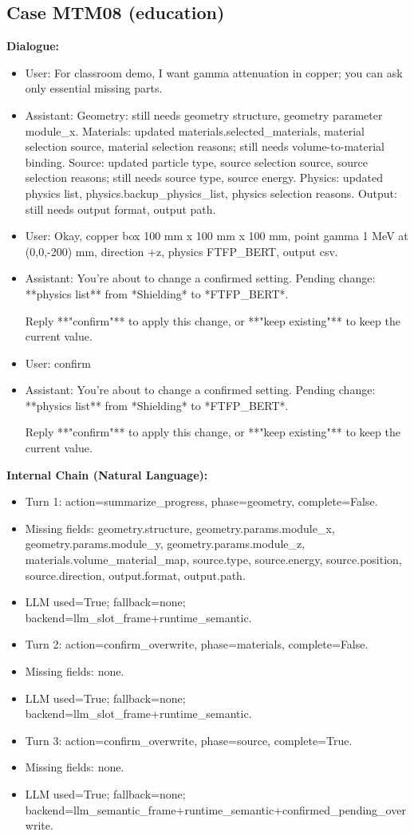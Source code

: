 \documentclass[11pt]{ctexart}
\begin{document}
\subsection{Case MTM08 (education)}
\textbf{Dialogue:}
\begin{itemize}
\item User: For classroom demo, I want gamma attenuation in copper; you can ask only essential missing parts.
\item Assistant: Geometry: still needs geometry structure, geometry parameter module\_x. Materials: updated materials.selected\_materials, material selection source, material selection reasons; still needs volume-to-material binding. Source: updated particle type, source selection source, source selection reasons; still needs source type, source energy. Physics: updated physics list, physics.backup\_physics\_list, physics selection reasons. Output: still needs output format, output path.
\item User: Okay, copper box 100 mm x 100 mm x 100 mm, point gamma 1 MeV at (0,0,-200) mm, direction +z, physics FTFP\_BERT, output csv.
\item Assistant: You're about to change a confirmed setting.  
Pending change: **physics list** from *Shielding* to *FTFP\_BERT*.  

Reply **"confirm"** to apply this change, or **"keep existing"** to keep the current value.
\item User: confirm
\item Assistant: You're about to change a confirmed setting.  
Pending change: **physics list** from *Shielding* to *FTFP\_BERT*.  

Reply **"confirm"** to apply this change, or **"keep existing"** to keep the current value.
\end{itemize}
\textbf{Internal Chain (Natural Language):}
\begin{itemize}
\item Turn 1: action=summarize\_progress, phase=geometry, complete=False.
\item Missing fields: geometry.structure, geometry.params.module\_x, geometry.params.module\_y, geometry.params.module\_z, materials.volume\_material\_map, source.type, source.energy, source.position, source.direction, output.format, output.path.
\item LLM used=True; fallback=none; backend=llm\_slot\_frame+runtime\_semantic.
\item Turn 2: action=confirm\_overwrite, phase=materials, complete=False.
\item Missing fields: none.
\item LLM used=True; fallback=none; backend=llm\_slot\_frame+runtime\_semantic.
\item Turn 3: action=confirm\_overwrite, phase=source, complete=True.
\item Missing fields: none.
\item LLM used=True; fallback=none; backend=llm\_semantic\_frame+runtime\_semantic+confirmed\_pending\_overwrite.
\end{itemize}
\end{document}
